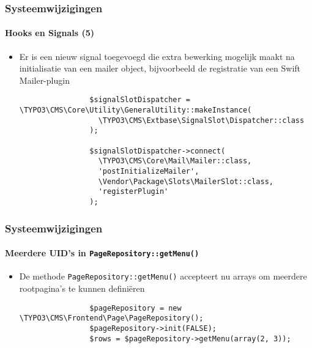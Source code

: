 \begin{frame}[fragile]
	\frametitle{Systeemwijzigingen}
	\framesubtitle{Hooks en Signals (5)}

	\lstset{basicstyle=\tiny\ttfamily}

	\begin{itemize}

		\item Er is een nieuw signal toegevoegd die extra bewerking mogelijk maakt na initialisatie 
			van een mailer object, bijvoorbeeld de registratie van een Swift Mailer-plugin

			\begin{lstlisting}
				$signalSlotDispatcher = \TYPO3\CMS\Core\Utility\GeneralUtility::makeInstance(
				  \TYPO3\CMS\Extbase\SignalSlot\Dispatcher::class
				);

				$signalSlotDispatcher->connect(
				  \TYPO3\CMS\Core\Mail\Mailer::class,
				  'postInitializeMailer',
				  \Vendor\Package\Slots\MailerSlot::class,
				  'registerPlugin'
				);
		\end{lstlisting}

	\end{itemize}

\end{frame}


\begin{frame}[fragile]
	\frametitle{Systeemwijzigingen}
	\framesubtitle{Meerdere UID's in \texttt{PageRepository::getMenu()}}

	\begin{itemize}


		\item De methode \texttt{PageRepository::getMenu()} accepteert nu arrays 
			om meerdere rootpagina's te kunnen definiëren

			\begin{lstlisting}
				$pageRepository = new \TYPO3\CMS\Frontend\Page\PageRepository();
				$pageRepository->init(FALSE);
				$rows = $pageRepository->getMenu(array(2, 3));
			\end{lstlisting}

	\end{itemize}

\end{frame}

